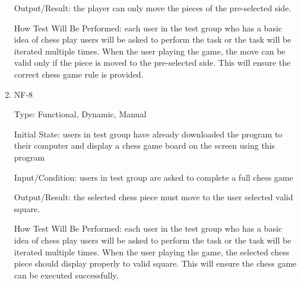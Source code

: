 \documentclass[12pt, titlepage]{article}
\begin{document}
\begin{enumerate}
Output/Result: the player can only move the pieces of the pre-selected side.

How Test Will Be Performed: each user in the test group who has a basic idea of chess play users will be asked to perform the task or the task will be iterated multiple times. When the user playing the game, the move can be valid only if the piece is moved to the pre-selected side. This will ensure the correct chess game rule is provided. 

\item{NF-8\\}

Type: Functional, Dynamic, Manual

Initial State: users in test group have already downloaded the program to their computer and display a chess game board on the screen using this program 

Input/Condition: users in test group are asked to complete a full chess game

Output/Result: the selected chess piece must move to the user selected valid square.

How Test Will Be Performed: each user in the test group who has a basic idea of chess play users will be asked to perform the task or the task will be iterated multiple times. When the user playing the game, the selected chess piece should display properly to valid square. This will ensure the chess game can be executed successfully. 


\end{enumerate}
\end{document}
